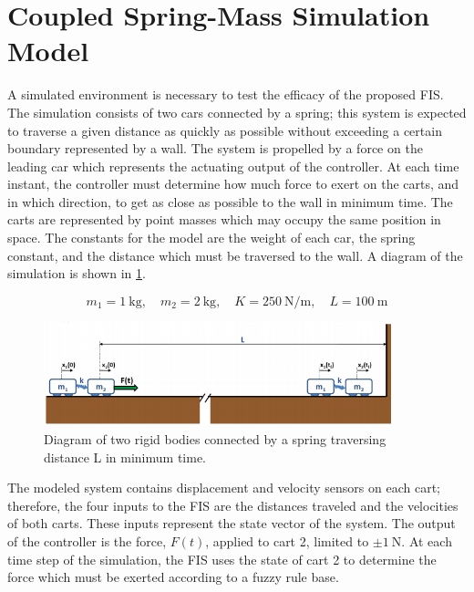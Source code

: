 \section{Coupled Spring-Mass Simulation Model}\label{s:model}
A simulated environment is necessary to test the efficacy of the proposed FIS. The simulation consists of two
cars connected by a spring; this system is expected to traverse a given distance as quickly as possible
without exceeding a certain boundary represented by a wall. The system is propelled by a force on the leading car
which represents the actuating output of the controller. At each time instant, the controller must determine
how much force to exert on the carts, and in which direction, to get as close as possible to the wall in
minimum time. The carts are represented by point masses which
may occupy the same position in space. The constants for the model are the weight of each car, the spring constant, and the distance
which must be traversed to the wall. A diagram of the simulation is shown in \cref{f:model}.

\begin{displaymath}
    m_{1}=\SI{1}{\kilogram}, \quad m_{2}=\SI{2}{\kilogram}, \quad K =
    \SI{250}{\newton\per\metre}, \quad L = \SI{100}{\metre}
\end{displaymath}

\begin{figure}
    \centering
    \includegraphics[width=0.9\textwidth]{images/model.png}
    \caption{Diagram of two rigid bodies connected by a spring traversing distance \textrm{L} in minimum
    time.} \label{f:model}
\end{figure}

The modeled system contains displacement and velocity sensors on each cart; therefore, the four inputs to the
FIS are the distances traveled and the velocities of both carts. These inputs represent the state vector of
the system. The output of the controller is the force, $F(t)$, applied to cart 2, limited to $\pm
\SI{1}{\newton}$. At each time step of the simulation, the FIS uses the state of cart 2 to determine the force
which must be exerted according to a fuzzy rule base. 

